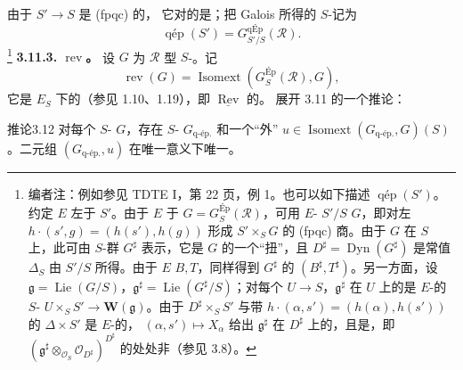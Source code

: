 由于 $S'\to S$ 是 (fpqc) 的，
它对的是；把 Galois 所得的 $S$-记为
\[\operatorname{qép}(S')=G^{\mathrm{qÉp}}_{S'/S}(\mathcal R).\]
\footnote[17]{编者注：例如参见 TDTE I，第 22 页，例 1。也可以如下描述 $\operatorname{qép}(S')$。约定 $E$ 左于 $S'$。由于 $E$ 于 $G=G^{\mathrm{Ép}}_S(\mathcal R)$，可用 $E$- $S'/S$  $G$，即对左 $h\cdot(s',g)=(h(s'),h(g))$ 形成 $S'\times_SG$ 的 (fpqc) 商。由于 $G$ 在 $S$ 上，此可由 $S$-群 $G^\sharp$ 表示，它是 $G$ 的一个“扭”，且 $D^\sharp=\operatorname{Dyn}(G^\sharp)$ 是常值 $\Delta_S$ 由 $S'/S$ 所得。由于 $E$  $B,T$，同样得到 $G^\sharp$ 的 $(B^\sharp,T^\sharp)$。另一方面，设 $\mathfrak g=\operatorname{Lie}(G/S)$，$\mathfrak g^\sharp=\operatorname{Lie}(G^\sharp/S)$；对每个 $U\to S$，$\mathfrak g^\sharp$ 在 $U$ 上的是 $E$-的 $S$- $U\times_SS'\to\mathbf W(\mathfrak g)$。由于 $D^\sharp\times_SS'$ 与带 $h\cdot(\alpha,s')=(h(\alpha),h(s'))$ 的 $\Delta\times S'$ 是 $E$-的， $(\alpha,s')\mapsto X_\alpha$ 给出 $\mathfrak g^\sharp$ 在 $D^\sharp$ 上的，且是，即 $(\mathfrak g^\sharp\otimes_{\mathcal O_S}\mathcal O_{D^\sharp})^{D^\sharp}$ 的处处非（参见 3.8）。}
\textbf{3.11.3.  $\operatorname{rev}$。} 设 $G$ 为 $\mathcal R$ 型 $S$-。记
\[\operatorname{rev}(G)=\operatorname{Isomext}(G^{\mathrm{Ép}}_S(\mathcal R),G),\]
它是 $E_S$ 下的（参见 1.10、1.19），即 $\underline{\operatorname{Rev}}$ 的。
展开 3.11 的一个推论：
\begin{SGAresult}{推论}{3.12}
对每个 $S$- $G$，存在 $S$- $G_{\mathrm{q\text{-}ép.}}$ 和一个“外” $u\in\operatorname{Isomext}(G_{\mathrm{q\text{-}ép.}},G)(S)$。二元组 $(G_{\mathrm{q\text{-}ép.}},u)$ 在唯一意义下唯一。
\end{SGAresult}
